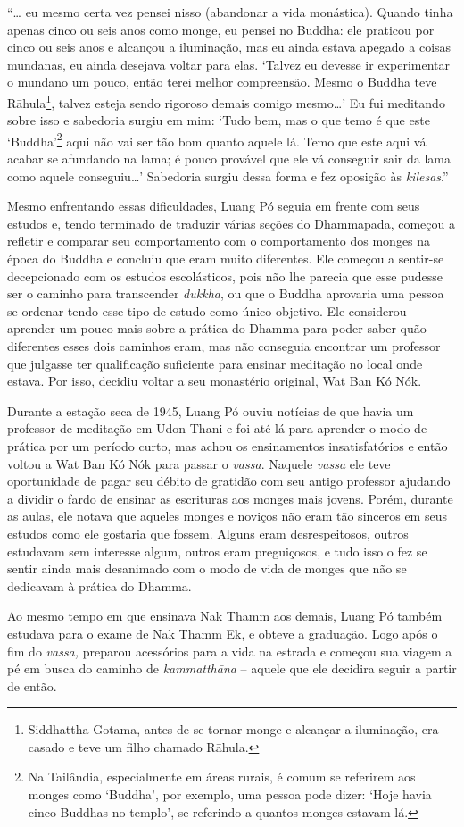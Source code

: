 ``\ldots{} eu mesmo certa vez pensei nisso (abandonar a vida monástica).
Quando tinha apenas cinco ou seis anos como monge, eu pensei no Buddha:
ele praticou por cinco ou seis anos e alcançou a iluminação, mas eu
ainda estava apegado a coisas mundanas, eu ainda desejava voltar para
elas. `Talvez eu devesse ir experimentar o mundano um pouco, então terei
melhor compreensão. Mesmo o Buddha teve Rāhula\footnote{Siddhattha
  Gotama, antes de se tornar monge e alcançar a iluminação, era casado e
  teve um filho chamado Rāhula.}, talvez esteja sendo rigoroso demais
comigo mesmo\ldots{}' Eu fui meditando sobre isso e sabedoria surgiu em
mim: `Tudo bem, mas o que temo é que este `Buddha'\footnote{Na
  Tailândia, especialmente em áreas rurais, é comum se referirem aos
  monges como `Buddha', por exemplo, uma pessoa pode dizer: `Hoje havia
  cinco Buddhas no templo', se referindo a quantos monges estavam lá.}
aqui não vai ser tão bom quanto aquele lá. Temo que este aqui vá acabar
se afundando na lama; é pouco provável que ele vá conseguir sair da lama
como aquele conseguiu\ldots{}' Sabedoria surgiu dessa forma e fez
oposição às \emph{kilesas}.''

Mesmo enfrentando essas dificuldades, Luang Pó seguia em frente com seus
estudos e, tendo terminado de traduzir várias seções do Dhammapada,
começou a refletir e comparar seu comportamento com o comportamento dos
monges na época do Buddha e concluiu que eram muito diferentes. Ele
começou a sentir-se decepcionado com os estudos escolásticos, pois não
lhe parecia que esse pudesse ser o caminho para transcender
\emph{dukkha}, ou que o Buddha aprovaria uma pessoa se ordenar tendo
esse tipo de estudo como único objetivo. Ele considerou aprender um
pouco mais sobre a prática do Dhamma para poder saber quão diferentes
esses dois caminhos eram, mas não conseguia encontrar um professor que
julgasse ter qualificação suficiente para ensinar meditação no local
onde estava. Por isso, decidiu voltar a seu monastério original, Wat Ban
Kó Nók.

Durante a estação seca de 1945, Luang Pó ouviu notícias de que havia um
professor de meditação em Udon Thani e foi até lá para aprender o modo
de prática por um período curto, mas achou os ensinamentos
insatisfatórios e então voltou a Wat Ban Kó Nók para passar o
\emph{vassa}. Naquele \emph{vassa} ele teve oportunidade de pagar seu
débito de gratidão com seu antigo professor ajudando a dividir o fardo
de ensinar as escrituras aos monges mais jovens. Porém, durante as
aulas, ele notava que aqueles monges e noviços não eram tão sinceros em
seus estudos como ele gostaria que fossem. Alguns eram desrespeitosos,
outros estudavam sem interesse algum, outros eram preguiçosos, e tudo
isso o fez se sentir ainda mais desanimado com o modo de vida de monges
que não se dedicavam à prática do Dhamma.

Ao mesmo tempo em que ensinava Nak Thamm aos demais, Luang Pó também
estudava para o exame de Nak Thamm Ek, e obteve a graduação. Logo após o
fim do \emph{vassa,} preparou acessórios para a vida na estrada e
começou sua viagem a pé em busca do caminho de \emph{kammatthāna} --
aquele que ele decidira seguir a partir de então.
